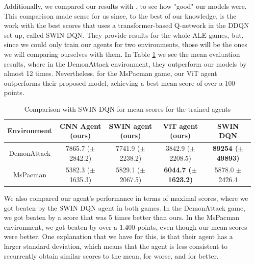 Additionally, we compared our results with \cite{meng2024deep}, to see how "good" our models were. This comparison made sense for us since, to the best of our knowledge, is the work with the best scores that uses a transformer-based Q-network in the DDQN set-up, called SWIN DQN. They provide results for the whole ALE games, but, since we could only train our agents for two environments, those will be the ones we will comparing ourselves with them. In Table \ref{tab:sota_mean_final_results} we see the mean evaluation results, where in the DemonAttack environment, they outperform our models by almost 12 times. Nevertheless, for the MsPacman game, our ViT agent outperforms their proposed model, achieving a best mean score of over a 100 points.

\begin{table}[!h]
	\begin{center}
		\caption[Comparison with SWIN DQN \cite{meng2024deep} for mean scores for the trained agents]{Comparison with SWIN DQN \cite{meng2024deep} for mean scores for the trained agents}
		\label{tab:sota_mean_final_results}
		\begin{tabular}{||c c c c c||} 
			\hline
			Environment& CNN Agent (ours)& SWIN agent (ours) & ViT agent (ours) & SWIN DQN\\ [0.5ex] 
			\hline\hline
			DemonAttack& 7865.7 ($\pm$ 2842.2) & 7741.9 ($\pm$ 2238.2) & 3842.9 ($\pm$ 2208.5) & \textbf{89254 ($\pm$ 49893)}\\ 
			\hline
			MsPacman & 5382.3 ($\pm$ 1635.3) & 5829.1 ($\pm$ 2067.5) & \textbf{6044.7 ($\pm$ 1623.2)}  & 5878.0 $\pm$ 2426.4 \\
			\hline
		\end{tabular}
	\end{center}
\end{table}

We also compared our agent's performance in terms of maximal scores, where we got beaten by the SWIN DQN agent in both games. In the DemonAttack game, we got beaten by a score that was 5 times better than ours. In the MsPacman environment, we got beaten by over a 1.400 points, even though our mean scores were better. One explanation that we have for this, is that their agent has a larger standard deviation, which means that the agent is less consistent to recurrently obtain similar scores to the mean, for worse, and for better.

